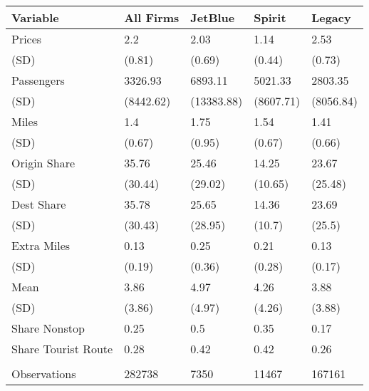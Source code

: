 
\begin{tabular}[t]{lllll}
\toprule
Variable & All Firms & JetBlue & Spirit & Legacy\\
\midrule
Prices & 2.2 & 2.03 & 1.14 & 2.53\\
(SD) & (0.81) & (0.69) & (0.44) & (0.73)\\
Passengers & 3326.93 & 6893.11 & 5021.33 & 2803.35\\
(SD) & (8442.62) & (13383.88) & (8607.71) & (8056.84)\\
Miles & 1.4 & 1.75 & 1.54 & 1.41\\
(SD) & (0.67) & (0.95) & (0.67) & (0.66)\\
Origin Share & 35.76 & 25.46 & 14.25 & 23.67\\
(SD) & (30.44) & (29.02) & (10.65) & (25.48)\\
Dest Share & 35.78 & 25.65 & 14.36 & 23.69\\
(SD) & (30.43) & (28.95) & (10.7) & (25.5)\\
Extra Miles & 0.13 & 0.25 & 0.21 & 0.13\\
(SD) & (0.19) & (0.36) & (0.28) & (0.17)\\
Mean & 3.86 & 4.97 & 4.26 & 3.88\\
(SD) & (3.86) & (4.97) & (4.26) & (3.88)\\
Share Nonstop & 0.25 & 0.5 & 0.35 & 0.17\\
Share Tourist Route & 0.28 & 0.42 & 0.42 & 0.26\\
\midrule\\
Observations & 282738 & 7350 & 11467 & 167161\\
\bottomrule
\end{tabular}
